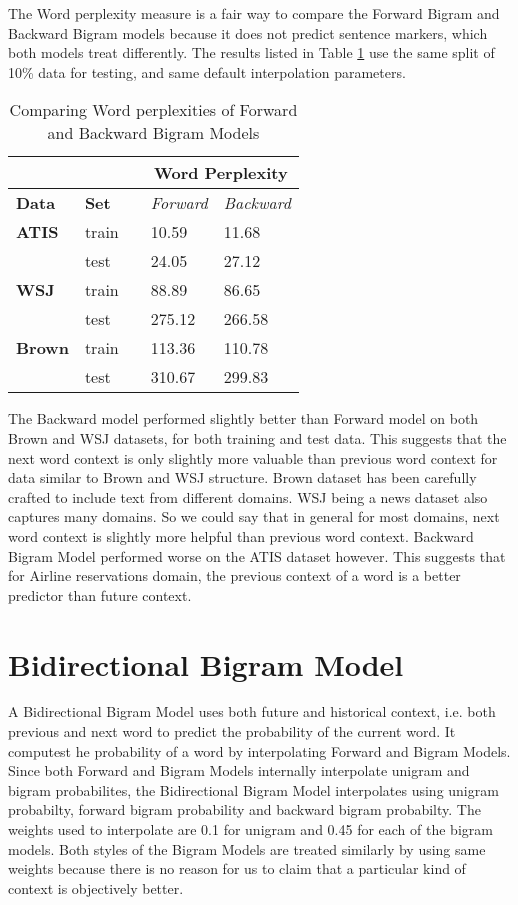 \documentclass{article}
\begin{document}
The Word perplexity measure is a fair way to compare the Forward Bigram and Backward Bigram models because it does not predict sentence markers, which both models treat  differently. The results listed in Table \ref{backvforw} use the same split of 10\% data for testing, and same default interpolation parameters.
\begin{table}[h]
\centering
\begin{tabular}{@{}lllll@{}}
\toprule
\textbf{}      & \textbf{}    &  & \multicolumn{2}{c}{\textbf{Word Perplexity}} \\ \midrule
\textbf{Data}  & \textbf{Set} &  & \textit{Forward}     & \textit{Backward}     \\ \midrule
\textbf{ATIS}  & train        &  & 10.59               & 11.68               \\ \midrule
               & test         &  & 24.05               & 27.12                \\ \midrule
\textbf{WSJ}   & train        &  & 88.89               & 86.65                \\ \midrule
               & test         &  & 275.12               & 266.58               \\ \midrule
\textbf{Brown} & train        &  & 113.36              & 110.78                \\ \midrule
               & test         &  & 310.67              & 299.83               \\ \bottomrule
\end{tabular}
\caption{Comparing Word perplexities of Forward and Backward Bigram Models}
\label{backvforw}
\end{table}
The Backward model performed slightly better than Forward model on both Brown and WSJ datasets, for both training and test data. This suggests that the next word context is only slightly more valuable than previous word context for data similar to Brown and WSJ structure. Brown dataset has been carefully crafted to include text from different domains. WSJ being a news dataset also captures many domains. So we could say that in general for most domains, next word context is slightly more helpful than previous word context. Backward Bigram Model performed worse on the ATIS dataset however. This suggests that for Airline reservations domain, the previous context of a word is a better predictor than future context. 
\section{Bidirectional Bigram Model}
A Bidirectional Bigram Model uses both future and historical context, i.e. both previous and next word to predict the probability of the current word. It computest he probability of a word by interpolating Forward and Bigram Models. Since both Forward and Bigram Models internally interpolate unigram and bigram probabilites, the Bidirectional Bigram Model interpolates using unigram probabilty, forward bigram probability and backward bigram probabilty. The weights used to interpolate are 0.1 for unigram and 0.45 for each of the bigram models. Both styles of the Bigram Models are treated similarly by using same weights because there is no reason for us to claim that a particular kind of context is objectively better. 
\end{document}
